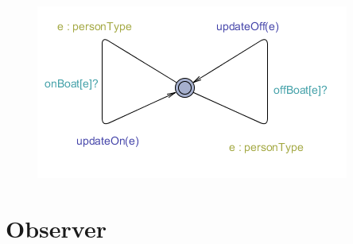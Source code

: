 \begin{figure}%
\includegraphics[width=\columnwidth]{pictures/observer.png}%
\caption{}%
\label{}%
\end{figure}




























\section{Observer}